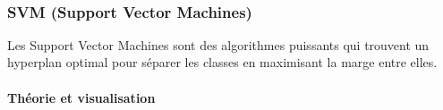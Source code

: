 \documentclass[11pt]{article}
\begin{document}
    \begin{center}
    \end{center}
    { \hspace*{\fill} \\}
    
    \subsubsection{SVM (Support Vector
Machines)}\label{svm-support-vector-machines}

Les Support Vector Machines sont des algorithmes puissants qui trouvent
un hyperplan optimal pour séparer les classes en maximisant la marge
entre elles.

\paragraph{Théorie et visualisation}\label{thuxe9orie-et-visualisation}
\end{document}
